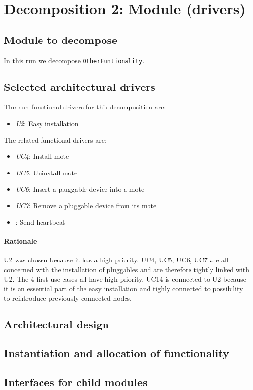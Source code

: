 \documentclass[english]{sareport}
\begin{document}
\section{Decomposition 2: Module (drivers)}
\subsection{Module to decompose}
In this run we decompose \texttt{OtherFuntionality}.
\subsection{Selected architectural drivers}
The non-functional drivers for this decomposition are:

\begin{itemize}
	\item \emph{U2}: Easy installation
\end{itemize}

The related functional drivers are:

\begin{itemize}
	\item \emph{UC4}: Install mote
	\item \emph{UC5}: Uninstall mote
	\item \emph{UC6}: Insert a pluggable device into a mote
	\item \emph{UC7}: Remove a pluggable device from its mote
	\item {}: Send heartbeat
\end{itemize}

\paragraph{Rationale}
U2 was chosen because it has a high priority. UC4, UC5, UC6, UC7 are all concerned with the installation of pluggables and are therefore tightly linked with U2. The 4 first use cases all have high priority. UC14 is connected to U2 because it is an essential part of the easy installation and tighly connected to possibility to reintroduce previously connected nodes.
\subsection{Architectural design}
\subsection{Instantiation and allocation of functionality}
\subsection{Interfaces for child modules}
\end{document}
